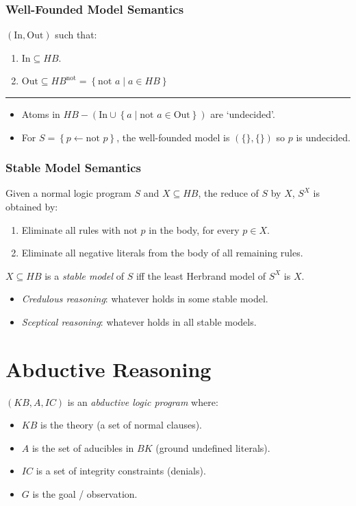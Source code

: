 \documentclass[twocolumn,english]{article}
\begin{document}
\subsubsection{Well-Founded Model Semantics}

$\left(\text{In},\text{Out}\right)$ such that:
\begin{enumerate}
\item $\text{In}\subseteq HB$.
\item $\text{Out}\subseteq HB^{\text{not}}=\left\{ \text{not }a\mid a\in HB\right\} $
\end{enumerate}
\rule[0.5ex]{0.25\columnwidth}{0.5pt}
\begin{itemize}
\item Atoms in $HB-\left(\text{In}\cup\left\{ a\mid\text{not }a\in\text{Out}\right\} \right)$
are `undecided'.
\item For $S=\left\{ p\leftarrow\text{not }p\right\} $, the well-founded
model is $\left(\{\},\{\}\right)$ so $p$ is undecided.
\end{itemize}

\subsubsection{Stable Model Semantics}

Given a normal logic program $S$ and $X\subseteq HB$, the reduce
of $S$ by $X$, $S^{X}$ is obtained by:
\begin{enumerate}
\item Eliminate all rules with $\text{not }p$ in the body, for every $p\in X$.
\item Eliminate all negative literals from the body of all remaining rules.
\end{enumerate}
$X\subseteq HB$ is a \emph{stable model} of $S$ iff the least Herbrand
model of $S^{X}$ is $X$. 
\begin{itemize}
\item \emph{Credulous reasoning}: whatever holds in some stable model.
\item \emph{Sceptical reasoning}: whatever holds in all stable models.
\end{itemize}

\section{Abductive Reasoning}

$\left(KB,A,IC\right)$ is an \emph{abductive logic program} where:
\begin{itemize}
\item $KB$ is the theory (a set of normal clauses).
\item $A$ is the set of aducibles in $BK$ (ground undefined literals).
\item $IC$ is a set of integrity constraints (denials).
\item $G$ is the goal / observation.
\end{itemize}
\end{document}
